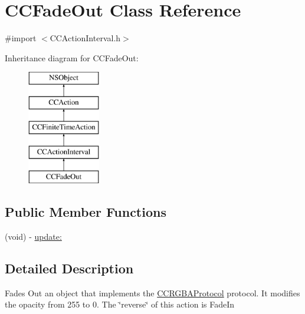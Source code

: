 \hypertarget{interface_c_c_fade_out}{\section{C\-C\-Fade\-Out Class Reference}
\label{interface_c_c_fade_out}
}


{\ttfamily \#import $<$C\-C\-Action\-Interval.\-h$>$}

Inheritance diagram for C\-C\-Fade\-Out\-:\begin{figure}[H]
\begin{center}
\leavevmode
\includegraphics[height=5.000000cm]{interface_c_c_fade_out}
\end{center}
\end{figure}
\subsection*{Public Member Functions}
\begin{DoxyCompactItemize}
\item 
(void) -\/ \hyperlink{interface_c_c_fade_out_a6440214d38d77a79a971db6eb0760162}{update\-:}
\end{DoxyCompactItemize}


\subsection{Detailed Description}
Fades Out an object that implements the \hyperlink{protocol_c_c_r_g_b_a_protocol-p}{C\-C\-R\-G\-B\-A\-Protocol} protocol. It modifies the opacity from 255 to 0. The \char`\"{}reverse\char`\"{} of this action is Fade\-In 

